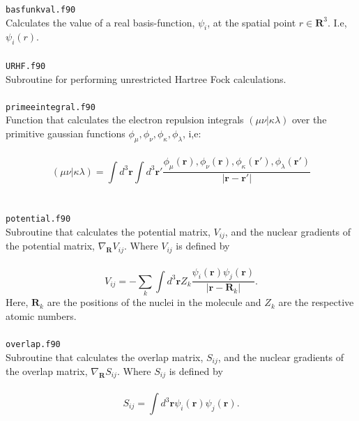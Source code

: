 \documentclass[a4paper,twoside,openany]{book}
\begin{document}
{{\texttt{basfunkval.f90}\\
Calculates the value of a real basis-function, $\psi_{i}$, at the spatial
point $r\in\mathbf{R}^3$. I.e, $\psi_{i}( r )$. \\ \\
\texttt{URHF.f90}\\
Subroutine for performing unrestricted Hartree Fock calculations. \\ \\
\texttt{primeeintegral.f90}\\
Function that calculates the electron repulsion integrals $(\mu \nu | \kappa \lambda )$ over the primitive 
gaussian functions $\phi_{\mu},\phi_{\nu},\phi_{\kappa},\phi_{\lambda}$, i,e: \\ \\
\begin{equation}
(\mu \nu | \kappa \lambda )=\int d^{3}\mathbf{r}\int d^{3}\mathbf{r}' \frac{\phi_{\mu}( \mathbf{r} ),\phi_{\nu}( \mathbf{r} ),\phi_{\kappa}(\mathbf{r}'),\phi_{\lambda}(\mathbf{r}')}{|\mathbf{r}-\mathbf{r}'|} \nonumber
\end{equation}
 \\ \\
\texttt{potential.f90}\\
Subroutine that calculates the potential matrix, $V_{ij}$, and the nuclear gradients of the potential matrix, $\nabla_{\mathbf{R}}V_{ij}$. Where $V_{ij}$ is defined by \\ \\
\begin{equation}
V_{ij} = -\sum_{k}\int d^{3}\mathbf{r}Z_{k}\frac{\psi_{i}( \mathbf{r} )\psi_{j}( \mathbf{r} )}{|\mathbf{r}-\mathbf{R}_{k}|}. \nonumber
\end{equation}
Here, $\mathbf{R}_{k}$ are the positions of the nuclei in the molecule and $Z_{k}$ are the respective atomic numbers.
\\ \\
\texttt{overlap.f90}\\
Subroutine that calculates the overlap matrix, $S_{ij}$, and the nuclear gradients of the overlap matrix, $\nabla_{\mathbf{R}}S_{ij}$. Where $S_{ij}$ is defined by \\ \\
\begin{equation}
S_{ij} = \int d^{3}\mathbf{r}\psi_{i}( \mathbf{r} )\psi_{j}( \mathbf{r} ). \nonumber
\end{equation}
\\ \\
}}
\end{document}
